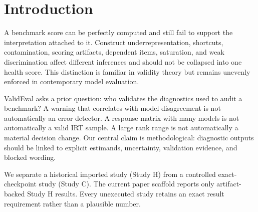 \section{Introduction}

A benchmark score can be perfectly computed and still fail to support the interpretation attached
to it. Construct underrepresentation, shortcuts, contamination, scoring artifacts, dependent
items, saturation, and weak discrimination affect different inferences and should not be collapsed
into one health score. This distinction is familiar in validity theory
\citep{messick1995validity,aera2014standards} but remains unevenly enforced in contemporary model
evaluation.

ValidEval asks a prior question: who validates the diagnostics used to audit a benchmark? A warning
that correlates with model disagreement is not automatically an error detector. A response matrix
with many models is not automatically a valid IRT sample. A large rank range is not automatically a
material decision change. Our central claim is methodological: diagnostic outputs should be linked
to explicit estimands, uncertainty, validation evidence, and blocked wording.

We separate a historical imported study (Study H) from a controlled exact-checkpoint study (Study
C). The current paper scaffold reports only artifact-backed Study H results. Every unexecuted study
retains an exact result requirement rather than a plausible number.

